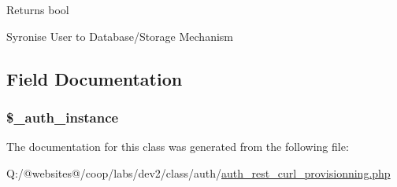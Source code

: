\begin{DoxyReturn}{Returns}
bool 
\end{DoxyReturn}
Syronise User to Database/\-Storage Mechanism

\subsection{Field Documentation}
\hypertarget{class_xortify_auth_rest___curl_provisionning_a486ed878bb5a7188c99ac4c9ee46ac6e}{
\subsubsection[{\$\-\_\-auth\-\_\-instance}]{\setlength{\rightskip}{0pt plus 5cm}\$\-\_\-auth\-\_\-instance}}\label{class_xortify_auth_rest___curl_provisionning_a486ed878bb5a7188c99ac4c9ee46ac6e}


The documentation for this class was generated from the following file\-:\begin{DoxyCompactItemize}
\item 
Q\-:/@websites@/coop/labs/dev2/class/auth/\hyperlink{auth__rest__curl__provisionning_8php}{auth\-\_\-rest\-\_\-curl\-\_\-provisionning.\-php}\end{DoxyCompactItemize}
